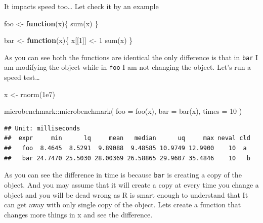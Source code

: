 \documentclass[
]{book}
\newenvironment{Shaded}{\begin{snugshade}}{\end{snugshade}}
\newcommand{\AttributeTok}[1]{\textcolor[rgb]{0.77,0.63,0.00}{#1}}
\newcommand{\ControlFlowTok}[1]{\textcolor[rgb]{0.13,0.29,0.53}{\textbf{#1}}}
\newcommand{\DecValTok}[1]{\textcolor[rgb]{0.00,0.00,0.81}{#1}}
\newcommand{\FloatTok}[1]{\textcolor[rgb]{0.00,0.00,0.81}{#1}}
\newcommand{\FunctionTok}[1]{\textcolor[rgb]{0.00,0.00,0.00}{#1}}
\newcommand{\NormalTok}[1]{#1}
\newcommand{\OtherTok}[1]{\textcolor[rgb]{0.56,0.35,0.01}{#1}}
\newcommand{\SpecialCharTok}[1]{\textcolor[rgb]{0.00,0.00,0.00}{#1}}
\begin{document}
It impacts speed too\ldots{} Let check it by an example

\begin{Shaded}
\begin{Highlighting}[]
\NormalTok{foo }\OtherTok{\textless{}{-}} \ControlFlowTok{function}\NormalTok{(x)\{}
  \FunctionTok{sum}\NormalTok{(x)}
\NormalTok{\}}

\NormalTok{bar }\OtherTok{\textless{}{-}} \ControlFlowTok{function}\NormalTok{(x)\{}
\NormalTok{  x[[}\DecValTok{1}\NormalTok{]] }\OtherTok{\textless{}{-}} \DecValTok{1}
  \FunctionTok{sum}\NormalTok{(x)}
\NormalTok{\}}
\end{Highlighting}
\end{Shaded}

As you can see both the functions are identical the only difference is that in \texttt{bar} I am modifying the object while in \texttt{foo} I am not changing the object. Let's run a speed test\ldots{}

\begin{Shaded}
\begin{Highlighting}[]
\NormalTok{x }\OtherTok{\textless{}{-}} \FunctionTok{rnorm}\NormalTok{(}\FloatTok{1e7}\NormalTok{)}

\NormalTok{microbenchmark}\SpecialCharTok{::}\FunctionTok{microbenchmark}\NormalTok{(}
  \AttributeTok{foo =} \FunctionTok{foo}\NormalTok{(x),}
  \AttributeTok{bar =} \FunctionTok{bar}\NormalTok{(x),}
  \AttributeTok{times =} \DecValTok{10}
\NormalTok{)}
\end{Highlighting}
\end{Shaded}

\begin{verbatim}
## Unit: milliseconds
##  expr     min      lq     mean   median      uq     max neval cld
##   foo  8.4645  8.5291  9.89088  9.48585 10.9749 12.9900    10  a 
##   bar 24.7470 25.5030 28.00369 26.58865 29.9607 35.4846    10   b
\end{verbatim}

As you can see the difference in time is because \texttt{bar} is creating a copy of the object. And you may assume that it will create a copy at every time you change a object and you will be dead wrong as R is smart enough to understand that It can get away with only single copy of the object. Lets create a function that changes more things in x and see the difference.
\end{document}
